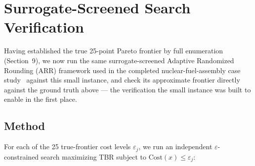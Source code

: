 \documentclass[11pt]{article}
\begin{document}
\section{Surrogate-Screened Search Verification}
\label{sec:surrogate}

Having established the true 25-point Pareto frontier by full enumeration
(Section~9), we now run the same surrogate-screened Adaptive Randomized
Rounding (ARR) framework used in the completed nuclear-fuel-assembly case
study~\cite{chang2026} against this small instance, and check its
approximate frontier directly against the ground truth above --- the
verification the small instance was built to enable in the first place.

\subsection{Method}

For each of the 25 true-frontier cost levels $\varepsilon_j$, we run an
independent $\varepsilon$-constrained search maximizing TBR subject to
$\mathrm{Cost}(x)\le\varepsilon_j$:
\end{document}
